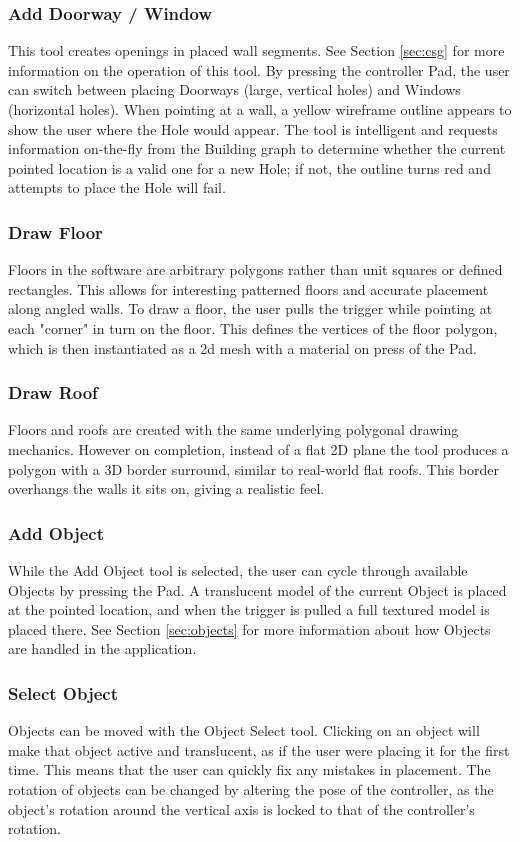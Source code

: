 \subsubsection*{Add Doorway / Window}
This tool creates openings in placed wall segments. See Section \ref{sec:csg} for more information on the operation of this tool. By pressing the controller Pad, the user can switch between placing Doorways (large, vertical holes) and Windows (horizontal holes). When pointing at a wall, a yellow wireframe outline appears to show the user where the Hole would appear. The tool is intelligent and requests information on-the-fly from the Building graph to determine whether the current pointed location is a valid one for a new Hole; if not, the outline turns red and attempts to place the Hole will fail.

\subsubsection*{Draw Floor}
Floors in the software are arbitrary polygons rather than unit squares or defined rectangles. This allows for interesting patterned floors and accurate placement along angled walls. To draw a floor, the user pulls the trigger while pointing at each "corner" in turn on the floor. This defines the vertices of the floor polygon, which is then instantiated as a 2d mesh with a material on press of the Pad.

\subsubsection*{Draw Roof}
Floors and roofs are created with the same underlying polygonal drawing mechanics. However on completion, instead of a flat 2D plane the tool produces a polygon with a 3D border surround, similar to real-world flat roofs. This border overhangs the walls it sits on, giving a realistic feel. 

\subsubsection*{Add Object}
While the Add Object tool is selected, the user can cycle through available Objects by pressing the Pad. A translucent model of the current Object is placed at the pointed location, and when the trigger is pulled a full textured model is placed there. See Section \ref{sec:objects} for more information about how Objects are handled in the application.

\subsubsection*{Select Object}
Objects can be moved with the Object Select tool. Clicking on an object will make that object active and translucent, as if the user were placing it for the first time. This means that the user can quickly fix any mistakes in placement. The rotation of objects can be changed by altering the pose of the controller, as the object's rotation around the vertical axis is locked to that of the controller's rotation.

